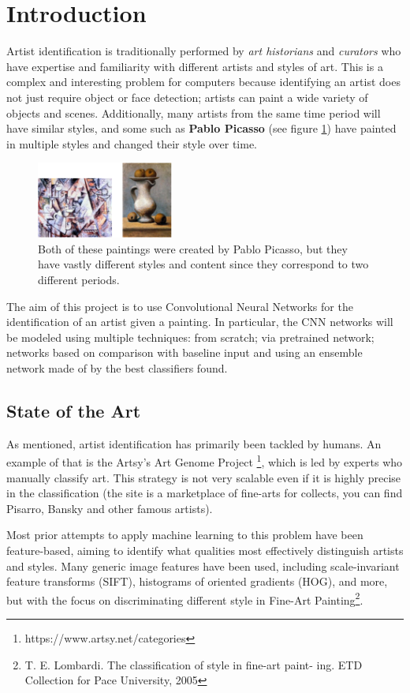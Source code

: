 \section{Introduction}
Artist identification is traditionally performed by \textit{art historians} and \textit{curators} who have expertise and familiarity with different artists and styles of art. This is a complex and interesting problem for computers because identifying an artist does not just require object or face detection; artists can paint a wide variety of objects and scenes. Additionally, many artists from the same time period will have similar styles, and some such as \textbf{Pablo Picasso} (see figure \ref{fig:picasso}) have painted in multiple styles and changed their style over time.

\begin{figure}[H]
	\centering
	\includegraphics[width=0.4\textwidth]{img/picasso.png}
	\caption{Both of these paintings were created by Pablo Picasso, but they have vastly different styles and content since they correspond to two different periods.}
	\label{fig:picasso}
\end{figure}

\noindent The aim of this project is to use Convolutional Neural Networks for the identification of an artist given a painting. In particular, the CNN networks will be modeled using multiple techniques: from scratch; via pretrained network; networks based on comparison with baseline input and using an ensemble network made of by the best classifiers found.


\subsection{State of the Art}
As mentioned, artist identification has primarily been tackled by humans. An example of that is the Artsy's Art Genome Project \footnote{https://www.artsy.net/categories}, which is led by experts who manually classify art. This strategy is not very scalable even if it is highly precise in the classification (the site is a marketplace of fine-arts for collects, you can find Pisarro, Bansky and other famous artists).

Most prior attempts to apply machine learning to this problem have been feature-based, aiming to identify what qualities most effectively distinguish artists and styles. Many generic image features have been used, including scale-invariant feature transforms (SIFT), histograms of oriented gradients (HOG), and more, but with the focus on discriminating different style in Fine-Art Painting\footnote{T. E. Lombardi. The classification of style in fine-art paint-
ing. ETD Collection for Pace University, 2005}.

